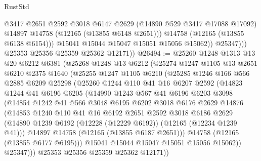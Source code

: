 \begin{lexlean}{RustStd}
\begin{coremodule}
                      @3417
                      @2651
                      @2592
                      @3018
                      @6147
                      @2629
                      (@14890 @529 @3417 @17088 @17092)
                      @14897
                      @14758
                      (@12165 (@13855 @6148 @2651)))
                    @14758
                    (@12165 (@13855 @6138 @6154)))
                  @15041
                  @15044
                  @15047
                  @15051
                  @15056
                  @15062))
              @25347)))
        @25353
        @25356
        @25359
        @25362
        @12171))
@26494 := @25260
    @1248
    @1313
    @13
    @20
    @6212
    @6381
    (@25268
      @1248
      @13
      @6212
      (@25274
        @1247
        @1105
        @13
        @2651
        @6210
        @2375
        @1640
        (@25255
          @1247
          @1105
          @6210
          (@25285
            @1246
            @166
            @566
            @2885
            @6209
            @25298
            (@25260
              @1244
              @110
              @41
              @16
              @6207
              @2592
              (@14823
                @1244
                @41
                @6196
                @6205
                (@14990
                  @1243
                  @567
                  @41
                  @6196
                  @6203
                  @3098
                  (@14854
                    @1242
                    @41
                    @566
                    @3048
                    @6195
                    @6202
                    @3018
                    @6176
                    @2629
                    @14876
                    (@14853
                      @1240
                      @110
                      @41
                      @16
                      @6192
                      @2651
                      @2592
                      @3018
                      @6186
                      @2629
                      (@14890 @1239 @6192 (@12228 (@12229 @6192)) (@12165 (@12234 @1239 @41)))
                      @14897
                      @14758
                      (@12165 (@13855 @6187 @2651)))
                    @14758
                    (@12165 (@13855 @6177 @6195)))
                  @15041
                  @15044
                  @15047
                  @15051
                  @15056
                  @15062))
              @25347)))
        @25353
        @25356
        @25359
        @25362
        @12171))

\end{coremodule}
\end{lexlean}
